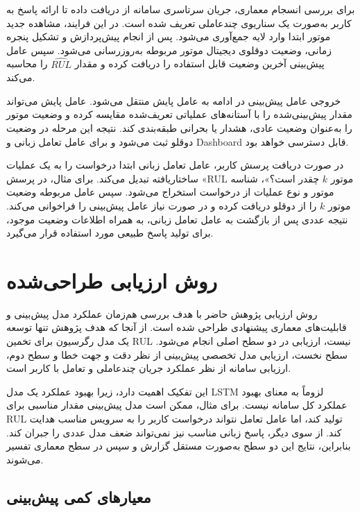 \documentclass[a4paper,fleqn]{report}
\begin{document}
برای بررسی انسجام معماری، جریان سرتاسری سامانه از دریافت داده تا
ارائه پاسخ به کاربر به‌صورت یک سناریوی چندعاملی تعریف شده است.
در این فرایند، مشاهده جدید موتور ابتدا وارد لایه جمع‌آوری می‌شود.
پس از انجام پیش‌پردازش و تشکیل پنجره زمانی، وضعیت دوقلوی دیجیتال
موتور مربوطه به‌روزرسانی می‌شود. سپس عامل پیش‌بینی آخرین وضعیت
قابل استفاده را دریافت کرده و مقدار $\widehat{RUL}$ را محاسبه
می‌کند.

خروجی عامل پیش‌بینی در ادامه به عامل پایش منتقل می‌شود. عامل
پایش می‌تواند مقدار پیش‌بینی‌شده را با آستانه‌های عملیاتی تعریف‌شده
مقایسه کرده و وضعیت موتور را به‌عنوان وضعیت عادی، هشدار یا بحرانی
طبقه‌بندی کند. نتیجه این مرحله در وضعیت دوقلو ثبت می‌شود و برای
عامل تعامل زبانی و \gls{Dashboard} قابل دسترسی خواهد بود.

در صورت دریافت پرسش کاربر، عامل تعامل زبانی ابتدا درخواست را به
یک عملیات ساختاریافته تبدیل می‌کند. برای مثال، در پرسش
«\gls{RUL} موتور $k$ چقدر است؟»، شناسه موتور و نوع عملیات از
درخواست استخراج می‌شود. سپس عامل مربوطه وضعیت موتور $k$ را از
دوقلو دریافت کرده و در صورت نیاز عامل پیش‌بینی را فراخوانی
می‌کند. نتیجه عددی پس از بازگشت به عامل تعامل زبانی، به همراه
اطلاعات وضعیت موجود، برای تولید پاسخ طبیعی مورد استفاده قرار
می‌گیرد.


\section{روش ارزیابی طراحی‌شده}
\label{sec:eval-design}

روش ارزیابی پژوهش حاضر با هدف بررسی هم‌زمان عملکرد مدل پیش‌بینی
و قابلیت‌های معماری پیشنهادی طراحی شده است. از آنجا که هدف پژوهش
تنها توسعه یک مدل رگرسیون برای تخمین \gls{RUL} نیست، ارزیابی در
دو سطح اصلی انجام می‌شود. سطح نخست، ارزیابی مدل تخصصی پیش‌بینی از
نظر دقت و جهت خطا و سطح دوم، ارزیابی سامانه از نظر عملکرد جریان
چندعاملی و تعامل با کاربر است.

این تفکیک اهمیت دارد، زیرا بهبود عملکرد یک مدل \gls{LSTM}
لزوماً به معنای بهبود عملکرد کل سامانه نیست. برای مثال، ممکن است
مدل پیش‌بینی مقدار مناسبی برای \gls{RUL} تولید کند، اما عامل
تعامل نتواند درخواست کاربر را به سرویس مناسب هدایت کند. از سوی
دیگر، پاسخ زبانی مناسب نیز نمی‌تواند ضعف مدل عددی را جبران کند.
بنابراین، نتایج این دو سطح به‌صورت مستقل گزارش و سپس در سطح
معماری تفسیر می‌شوند.

\subsection{معیارهای کمی پیش‌بینی}
\label{sec:prediction-metrics}
\end{document}
